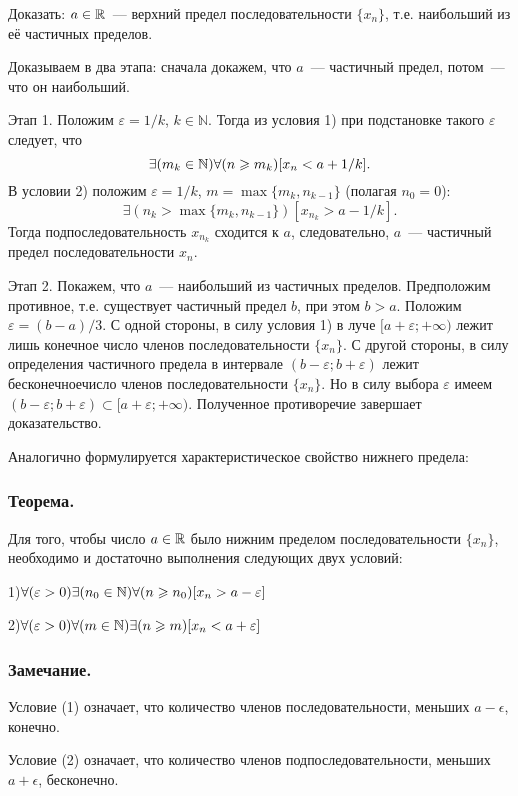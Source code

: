 Доказать: $a \in \mathbb{R}$~--- верхний предел последовательности $\{x_n\}$, т.е. наибольший из её частичных пределов.

Доказываем в два этапа: сначала докажем, что $a$~--- частичный предел,
потом~--- что он наибольший.

Этап 1.
Положим $\varepsilon = 1/k$, $k\in\mathbb{N}$.
Тогда из условия 1) при подстановке такого $\varepsilon$ следует, что
$$
	\exists(m_k \in \mathbb{N})\forall(n \geqslant m_k)[x_n < a + 1/k]
	.
$$
В условии 2) положим $\varepsilon = 1/k$, $m=\max\{m_k,n_{k-1}\}$ (полагая $n_0=0$):
$$
	\exists(n_k > \max\{m_k,n_{k-1}\}  )[x_{n_k} > a - 1/k]
	.
$$
Тогда подпоследовательность $x_{n_k}$ сходится к $a$,
следовательно, $a$~--- частичный предел последовательности $x_n$.

Этап 2.
Покажем, что $a$~--- наибольший из частичных пределов.
Предположим противное, т.е. существует частичный предел $b$, при этом $b>a$.
Положим $\varepsilon = (b-a)/3$.
С одной стороны, в силу условия 1) в луче $[a+\varepsilon; +\infty)$ лежит
лишь конечное число членов последовательности $\{x_n\}$.
С другой стороны, в силу определения частичного предела
в интервале $(b-\varepsilon; b+\varepsilon)$
лежит бесконечноечисло членов последовательности $\{x_n\}$.
Но в силу выбора $\varepsilon$ имеем
$(b-\varepsilon; b+\varepsilon) \subset \lbrack a+\varepsilon; +\infty)$.
Полученное противоречие завершает доказательство.


\par

Аналогично формулируется характеристическое свойство нижнего предела:

\subsubsection{Теорема.}

Для того, чтобы число $a \in \mathbb{R}$ было нижним пределом последовательности $\{x_n\}$, необходимо и достаточно выполнения следующих двух условий:

1)$\forall(\varepsilon >0 )\exists(n_0 \in \mathbb{N})\forall(n \geqslant n_0)[x_n > a - \varepsilon]$

2)$\forall(\varepsilon > 0)\forall(m   \in \mathbb{N})\exists(n \geqslant m  )[x_n < a + \varepsilon]$

\subsubsection{Замечание.}
Условие (1) означает, что количество членов последовательности, меньших $a-\epsilon$, конечно.

Условие (2) означает, что количество членов подпоследовательности, меньших $a+\epsilon$, бесконечно.


